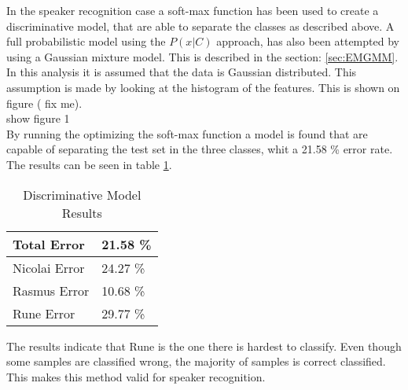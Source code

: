 In the speaker recognition case a soft-max function has been used to create a discriminative model, that are able to separate the classes as described above. A full probabilistic model using the $P(x|C)$ approach, has also been attempted by using a Gaussian mixture model. This is described in the section: \ref{sec:EMGMM}. In this analysis it is assumed that the data is Gaussian distributed. This assumption is made by looking at the histogram of the features. This is shown on figure ( fix me).\\

show figure 1\\

By running the optimizing the soft-max function a model is found that are capable of separating the test set in the three classes, whit a 21.58 \% error rate. The results can be seen in table \ref{tab:resultTableProp}. 

\begin{table}[h]
\centering
\begin{tabular}{ll}
\hline
Total Error   & 21.58 \% \\ \hline
Nicolai Error & 24.27 \% \\
Rasmus Error  & 10.68 \% \\
Rune Error    & 29.77 \% \\ \hline
\end{tabular}
\caption{Discriminative Model Results}
\label{tab:resultTableProp}
\end{table}

The results indicate that Rune is the one there is hardest to classify. Even though some samples are classified wrong, the majority of samples is correct classified. This makes this method valid for speaker recognition. \\
\ \\


